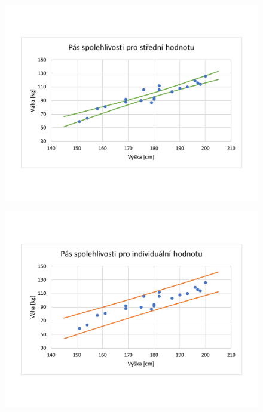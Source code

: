\begin{figure}[H]
    \centering
    \includegraphics[width=.9\linewidth]{2-c-3-crop.pdf}
\end{figure}
\bigskip

\begin{figure}[H]
    \centering
    \includegraphics[width=.9\linewidth]{2-c-4-crop.pdf}
\end{figure}
